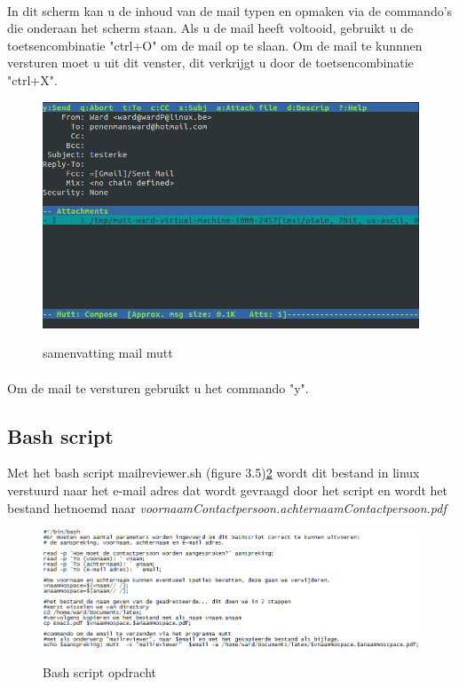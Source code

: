 \documentclass[12pt,a4paper]{report}
\begin{document}
\begin{flushleft}
\paragraph*{}
In dit scherm kan u de inhoud van de mail typen en opmaken via de commando's die onderaan het scherm staan. Als u de mail heeft voltooid, gebruikt u de toetsencombinatie "ctrl+O" om de mail op te slaan. Om de mail te kunnnen versturen moet u uit dit venster, dit verkrijgt u door de toetsencombinatie "ctrl+X".
\begin{figure}[H]
\includegraphics[scale=0.75]{images/mutt_03.png}
\label{mutt_03}
\centering 
\vspace{-10pt}
\caption{samenvatting mail mutt}
\end{figure}
\paragraph*{}
Om de mail te versturen gebruikt u het commando "y".
\subsection{Bash script}
Met het bash script mailreviewer.sh (figure 3.5)\ref{bash_01} wordt dit bestand in linux verstuurd naar het e-mail adres dat wordt gevraagd door het script en wordt het bestand hetnoemd naar \textit{voornaamContactpersoon.achternaamContactpersoon.pdf}
\begin{figure}[H]
\includegraphics[scale=0.75]{images/bash_01.png}
\label{bash_01}
\centering 
\vspace{-10pt}
\caption{Bash script opdracht}
\end{figure}


\end{flushleft}
\end{document}
